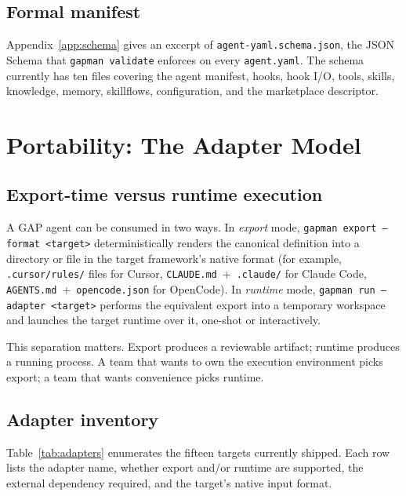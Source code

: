 \documentclass[11pt,a4paper]{article}
\begin{document}
\subsection{Formal manifest}

Appendix~\ref{app:schema} gives an excerpt of \texttt{agent-yaml.schema.json}, the
JSON Schema that \texttt{gapman validate} enforces on every \texttt{agent.yaml}. The
schema currently has ten files covering the agent manifest, hooks, hook I/O, tools,
skills, knowledge, memory, skillflows, configuration, and the marketplace descriptor.

\section{Portability: The Adapter Model}\label{sec:portability}

\subsection{Export-time versus runtime execution}

A GAP agent can be consumed in two ways. In \emph{export} mode, \texttt{gapman export
--format <target>} deterministically renders the canonical definition into a directory
or file in the target framework's native format (for example, \texttt{.cursor/rules/}
files for Cursor, \texttt{CLAUDE.md}~+~\texttt{.claude/} for Claude Code,
\texttt{AGENTS.md}~+~\texttt{opencode.json} for OpenCode). In \emph{runtime} mode,
\texttt{gapman run --adapter <target>} performs the equivalent export into a temporary
workspace and launches the target runtime over it, one-shot or interactively.

This separation matters. Export produces a reviewable artifact; runtime produces a
running process. A team that wants to own the execution environment picks export;
a team that wants convenience picks runtime.

\subsection{Adapter inventory}

Table~\ref{tab:adapters} enumerates the fifteen targets currently shipped. Each row
lists the adapter name, whether export and/or runtime are supported, the external
dependency required, and the target's native input format.
\end{document}
